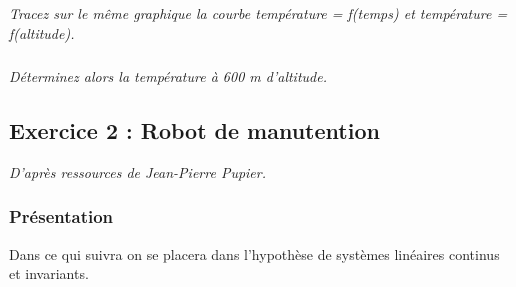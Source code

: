 \documentclass[11pt,oneside]{article}
\begin{document}
\subparagraph{}
\textit{Tracez sur le même graphique la courbe température = f(temps) et 
température = f(altitude).}
\textit{}


\subparagraph{}
\textit{Déterminez alors la température à 600 m d’altitude.}
\textit{}



\subsection*{Exercice 2 : Robot de manutention}
\begin{flushright}
\textit{D'après ressources de Jean-Pierre Pupier.} 
\end{flushright}

\subsubsection*{Présentation}

\setcounter{subparagraph}{0}


Dans ce qui suivra on se placera dans l’hypothèse de systèmes linéaires continus et invariants.
\end{document}
